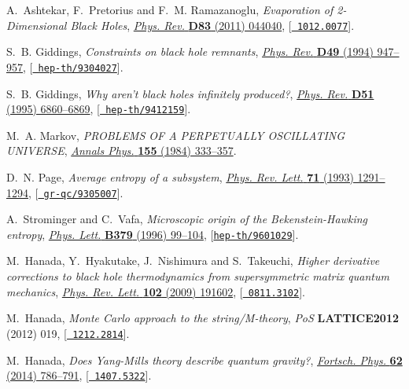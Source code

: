 \documentclass[10pt]{article}
\begin{document}
\begin{thebibliography}{100}
A.~Ashtekar, F.~Pretorius and F.~M. Ramazanoglu, \emph{{Evaporation of
  2-Dimensional Black Holes}},
  \href{http://dx.doi.org/10.1103/PhysRevD.83.044040}{\emph{Phys. Rev.} {\bf
  D83} (2011) 044040}, [\href{http://arxiv.org/abs/1012.0077}{{\tt
  1012.0077}}].

S.~B. Giddings, \emph{{Constraints on black hole remnants}},
  \href{http://dx.doi.org/10.1103/PhysRevD.49.947}{\emph{Phys. Rev.} {\bf D49}
  (1994) 947--957}, [\href{http://arxiv.org/abs/hep-th/9304027}{{\tt
  hep-th/9304027}}].

S.~B. Giddings, \emph{{Why aren't black holes infinitely produced?}},
  \href{http://dx.doi.org/10.1103/PhysRevD.51.6860}{\emph{Phys. Rev.} {\bf D51}
  (1995) 6860--6869}, [\href{http://arxiv.org/abs/hep-th/9412159}{{\tt
  hep-th/9412159}}].

M.~A. Markov, \emph{{PROBLEMS OF A PERPETUALLY OSCILLATING UNIVERSE}},
  \href{http://dx.doi.org/10.1016/0003-4916(84)90004-6}{\emph{Annals Phys.}
  {\bf 155} (1984) 333--357}.

D.~N. Page, \emph{{Average entropy of a subsystem}},
  \href{http://dx.doi.org/10.1103/PhysRevLett.71.1291}{\emph{Phys. Rev. Lett.}
  {\bf 71} (1993) 1291--1294}, [\href{http://arxiv.org/abs/gr-qc/9305007}{{\tt
  gr-qc/9305007}}].

A.~Strominger and C.~Vafa, \emph{{Microscopic origin of the Bekenstein-Hawking
  entropy}}, \href{http://dx.doi.org/10.1016/0370-2693(96)00345-0}{\emph{Phys.
  Lett.} {\bf B379} (1996) 99--104},
  [\href{http://arxiv.org/abs/hep-th/9601029}{{\tt hep-th/9601029}}].

M.~Hanada, Y.~Hyakutake, J.~Nishimura and S.~Takeuchi, \emph{{Higher derivative
  corrections to black hole thermodynamics from supersymmetric matrix quantum
  mechanics}},
  \href{http://dx.doi.org/10.1103/PhysRevLett.102.191602}{\emph{Phys. Rev.
  Lett.} {\bf 102} (2009) 191602}, [\href{http://arxiv.org/abs/0811.3102}{{\tt
  0811.3102}}].

M.~Hanada, \emph{{Monte Carlo approach to the string/M-theory}}, {\emph{PoS}
  {\bf LATTICE2012} (2012) 019}, [\href{http://arxiv.org/abs/1212.2814}{{\tt
  1212.2814}}].

M.~Hanada, \emph{{Does Yang-Mills theory describe quantum gravity?}},
  \href{http://dx.doi.org/10.1002/prop.201400047}{\emph{Fortsch. Phys.} {\bf
  62} (2014) 786--791}, [\href{http://arxiv.org/abs/1407.5322}{{\tt
  1407.5322}}].


\end{thebibliography}
\end{document}

